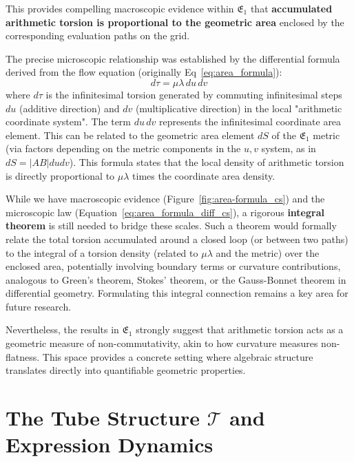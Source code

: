 \documentclass[12pt]{article}
\begin{document}
This provides compelling macroscopic evidence within \( \mathfrak{E}_1 \) that \textbf{accumulated arithmetic torsion is proportional to the geometric area} enclosed by the corresponding evaluation paths on the grid.

The precise microscopic relationship was established by the differential formula derived from the flow equation (originally Eq~\eqref{eq:area_formula}):
\begin{equation}
    d\tau = \mu \lambda\, du\, dv \label{eq:area_formula_diff_cs}
\end{equation}
where \( d\tau \) is the infinitesimal torsion generated by commuting infinitesimal steps \( du \) (additive direction) and \( dv \) (multiplicative direction) in the local "arithmetic coordinate system". The term \( du\, dv \) represents the infinitesimal coordinate area element. This can be related to the geometric area element \( dS \) of the \( \mathfrak{E}_1 \) metric (via factors depending on the metric components in the \( u,v \) system, as in \( dS = |AB| du dv \)). This formula states that the local density of arithmetic torsion is directly proportional to \( \mu \lambda \) times the coordinate area density.

While we have macroscopic evidence (Figure~\ref{fig:area-formula_cs}) and the microscopic law (Equation~\eqref{eq:area_formula_diff_cs}), a rigorous \textbf{integral theorem} is still needed to bridge these scales. Such a theorem would formally relate the total torsion accumulated around a closed loop (or between two paths) to the integral of a torsion density (related to \( \mu \lambda \) and the metric) over the enclosed area, potentially involving boundary terms or curvature contributions, analogous to Green's theorem, Stokes' theorem, or the Gauss-Bonnet theorem in differential geometry. Formulating this integral connection remains a key area for future research.

Nevertheless, the results in \( \mathfrak{E}_1 \) strongly suggest that arithmetic torsion acts as a geometric measure of non-commutativity, akin to how curvature measures non-flatness. This space provides a concrete setting where algebraic structure translates directly into quantifiable geometric properties.


\section{The Tube Structure \( \mathcal{T} \) and Expression Dynamics} %
\end{document}
